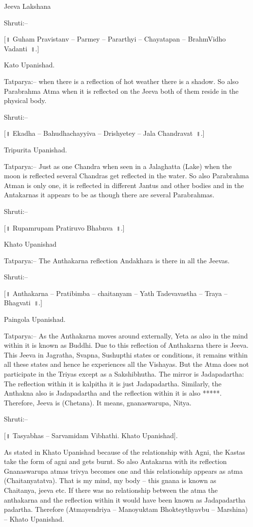 Jeeva Lakshana

Shruti:–

[॥ Guham Pravistanv – Parmey – Pararthyi – Chayatapan – BrahmVidho Vadanti~॥.]

Kato Upanishad.

Tatparya:– when there is a reflection of hot weather there is a shadow. So also Parabrahma Atma when it is reflected on the Jeeva both of them reside in the physical body.

Shruti:–

[॥ Ekadha – Bahudhachayyiva – Drishyetey – Jala Chandravat~॥.]

Tripurita Upanishad.

Tatparya:– Just as one Chandra when seen in a Jalaghatta (Lake) when the moon is reflected several Chandras get reflected in the water. So also Parabrahma Atman is only one, it is reflected in different Jantus and other bodies and in the Antakarnas it appears to be as though there are several Parabrahmas.

Shruti:–

[॥ Rupamrupam Pratiruvo Bhabnva~॥.]

Khato Upanishad

Tatparya:– The Anthakarna reflection Andakhara is there in all the Jeevas.

Shruti:–

[॥ Anthakarna – Pratibimba – chaitanyam – Yath Tadevavastha – Traya – Bhagvati~॥.]

Paingola Upanishad.

Tatparya:– As the Anthakarna moves around externally, Yeta as also in the mind within it is known as Buddhi. Due to this reflection of Anthakarna there is Jeeva. This Jeeva in Jagratha, Svapna, Sushupthi states or conditions, it remains within all these states and hence he experiences all the Vishayas. But the Atma does not participate in the Triyas except as a Sakshibhutha. The mirror is Jadapadartha: The reflection within it is kalpitha it is just Jadapadartha. Similarly, the Anthakna also is Jadapadartha and the reflection within it is also *****. Therefore, Jeeva is (Chetana). It means, gnanaswarupa, Nitya.

Shruti:–

[॥ Tasyabhas – Sarvamidam Vibhathi. Khato Upanishad].

As stated in Khato Upanishad because of the relationship with Agni, the Kastas take the form of agni and gets burnt. So also Antakarna with its reflection Gnanaswarupa atmas trivya becomes one and this relationship appears as atma (Chaitanyatatva). That is my mind, my body – this gnana is known as Chaitanya, jeeva etc. If there was no relationship between the atma the anthakarna and the reflection within it would have been known as Jadapadartha padartha. Therefore (Atmayendriya – Manoyuktam Bhokteythyavbu – Marshina) – Khato Upanishad.

